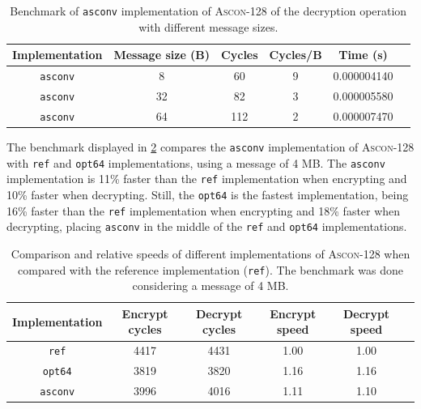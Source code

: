 \documentclass[11pt,twoside]{article}
\begin{document}
\begin{table}[h]
  \centering
  \begin{tabular}{|c|c|c|c|c|c|}
    \hline
    \textbf{Implementation} & \textbf{Message size (B)} &
    \textbf{Cycles}         & \textbf{Cycles/B}         & \textbf{Time (s)}                   \\ \hline

    \texttt{asconv}         & 8                         & 60                & 9 & 0.000004140 \\ \hline

    \texttt{asconv}         & 32                        & 82                & 3 & 0.000005580 \\ \hline

    \texttt{asconv}         & 64                        & 112               & 2 & 0.000007470 \\ \hline
  \end{tabular}
  \caption{Benchmark of \texttt{asconv} implementation of \textsc{Ascon-128} of the decryption operation with different message sizes.}
  \label{table:asconvDecryptionBenchmark}
\end{table}

The benchmark displayed in \cref{table:relativeBenchmark} compares the \texttt{asconv} implementation of \textsc{Ascon-128} with \texttt{ref} and \texttt{opt64} implementations, using a message of 4 MB. The \texttt{asconv} implementation is 11\% faster than the \texttt{ref} implementation when encrypting and 10\% faster when decrypting. Still, the \texttt{opt64} is the fastest implementation, being 16\% faster than the \texttt{ref} implementation when encrypting and 18\% faster when decrypting, placing \texttt{asconv} in the middle of the \texttt{ref} and \texttt{opt64} implementations.

\begin{table}[h]
  \centering
  \begin{tabular}{|c|c|c|c|c|c|}
    \hline
    \textbf{Implementation} & \textbf{Encrypt cycles} &
    \textbf{Decrypt cycles} & \textbf{Encrypt speed}  & \textbf{Decrypt speed}               \\ \hline

    \texttt{ref}            & 4417                    & 4431                   & 1.00 & 1.00 \\ \hline

    \texttt{opt64}          & 3819                    & 3820                   & 1.16 & 1.16 \\ \hline

    \texttt{asconv}         & 3996                    & 4016                   & 1.11 & 1.10 \\ \hline
  \end{tabular}
  \caption{Comparison and relative speeds of different implementations of \textsc{Ascon-128} when compared with the reference implementation (\texttt{ref}). The benchmark was done considering a message of 4 MB.}
  \label{table:relativeBenchmark}
\end{table}
\end{document}
